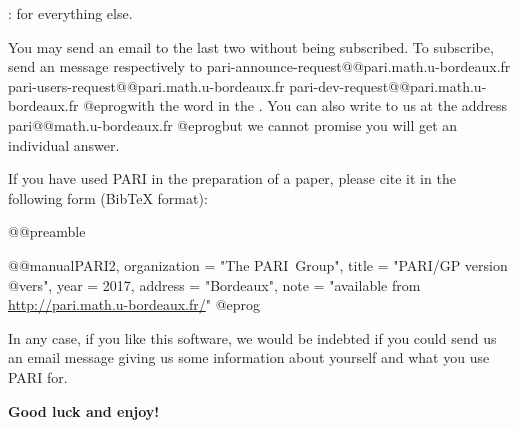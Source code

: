 \item {}: for everything else.

\noindent You may send an email to the last two without being subscribed.
To subscribe, send an message respectively to
\def\@{@}
\bprog
  pari-announce-request@@pari.math.u-bordeaux.fr
     pari-users-request@@pari.math.u-bordeaux.fr
       pari-dev-request@@pari.math.u-bordeaux.fr
@eprog\noindent with the word  in the .
You can also write to us at the address
\bprog
  pari@@math.u-bordeaux.fr
@eprog\noindent but we cannot promise you will get an individual answer.
\smallskip

If you have used PARI in the preparation of a paper, please cite it in the
following form (BibTeX format):

\bprog
@@preamble{\usepackage{url}}
@@manual{PARI2,
    organization = "{The PARI~Group}",
    title        = "{PARI/GP version @vers}",
    year         = 2017,
    address      = "Bordeaux",
    note         = "available from \url{http://pari.math.u-bordeaux.fr/}"
}
@eprog
\smallskip

\noindent In any case, if you like this software, we would be indebted if you
could send us an email message giving us some information about yourself and
what you use PARI for.

\medskip
{\bf Good luck and enjoy!}
\vfill\eject
